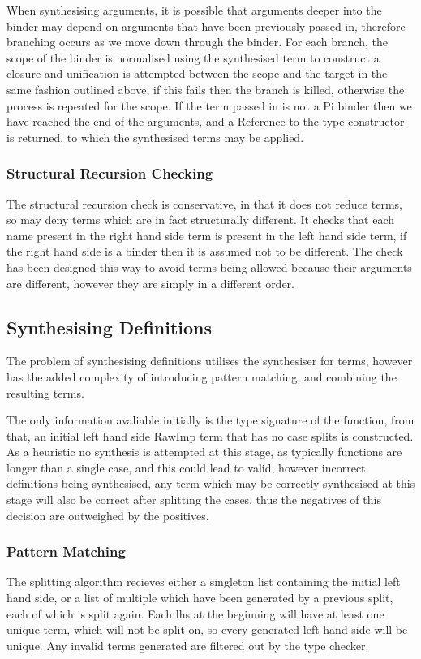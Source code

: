 \documentclass[a4paper]{article}
\begin{document}
When synthesising arguments, it is possible that arguments deeper into the binder
may depend on arguments that have been previously passed in, therefore branching 
occurs as we move down through the binder. For each branch, the scope of the binder
is normalised using the synthesised term to construct a closure and unification is 
attempted between the scope and the target in the same fashion outlined above, 
if this fails then the branch is killed, otherwise the process is repeated for the 
scope. If the term passed in is not a Pi binder then we have reached the end of the 
arguments, and a Reference to the type constructor is returned, to which the 
synthesised terms may be applied. 

\subsubsection{Structural Recursion Checking}
\label{sec:orgb4d20b2}
The structural recursion check is conservative, in that it does not reduce terms, 
so may deny terms which are in fact structurally different. It checks that each name
present in the right hand side term is present in the left hand side term, if the right 
hand side is a binder then it is assumed not to be different. The check has been designed
this way to avoid terms being allowed because their arguments are different, however they 
are simply in a different order.  	

\subsection{Synthesising Definitions}
\label{sec:org7318356}

The problem of synthesising definitions utilises the synthesiser for
terms, however has the added complexity of introducing pattern matching, 
and combining the resulting terms. 

The only information avaliable initially is the type 
signature of the function, from that, an initial left hand side RawImp
term that has no case splits is constructed. As a heuristic no synthesis 
is attempted at this stage, as typically functions are longer than a single 
case, and this could lead to valid, however incorrect definitions being
synthesised, any term which may be correctly synthesised at this stage will 
also be correct after splitting the cases, thus the negatives of this decision
are outweighed by the positives.

\subsubsection{Pattern Matching}
\label{sec:org38930cc}
The splitting algorithm recieves either a singleton list containing the initial
left hand side, or a list of multiple which have been generated by a previous split, 
each of which is split again. Each lhs at the beginning will have
at least one unique term, which will not be split on, so every generated
left hand side will be unique. Any invalid terms generated are filtered out by 
the type checker. 
\end{document}
